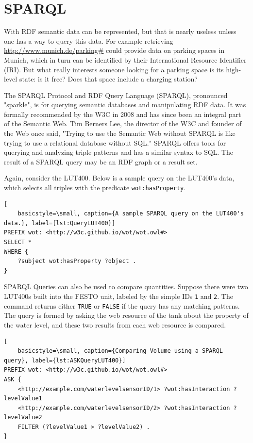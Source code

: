 \cite{Beckett.23.01.2018}

\section{SPARQL}
With RDF semantic data can be represented, but that is nearly useless unless one has a way to query this data.  For example retrieving \url{http://www.munich.de/parking#} could provide data on parking spaces in Munich, which in turn can be identified by their International Resource Identifier (IRI). \cite{Cyganiak.2014} But what really interests someone looking for a parking space is its high-level state: is it free? Does that space include a charging station?


The SPARQL  Protocol and RDF Query Language (SPARQL), pronounced "sparkle", is for querying semantic databases and manipulating RDF data. It was formally recommended by the W3C in 2008  \cite{Herman.2008} and has since been an integral part of the Semantic Web. Tim Berners Lee, the director of the W3C and founder of the Web once said, "Trying to use the Semantic Web without SPARQL is like trying to use a relational database without SQL." \cite{Herman.2008} SPARQL offers tools for querying and analyzing triple patterns and has a similar syntax to SQL. The result of a SPARQL query may be an RDF graph or a result set.

Again, consider the LUT400. Below is a sample query on the LUT400's data, which selects all triples with the predicate \texttt{wot:hasProperty}.

\begin{lstlisting}[
    basicstyle=\small, caption={A sample SPARQL query on the LUT400's data.}, label={lst:QueryLUT400}]
PREFIX wot: <http://w3c.github.io/wot/wot.owl#>
SELECT *
WHERE {
    ?subject wot:hasProperty ?object .
}
\end{lstlisting}

SPARQL Queries can also be used to compare quantities. Suppose there were two LUT400s built into the FESTO unit, labeled by the simple IDs \texttt{1} and \texttt{2}. The  command returns either \texttt{TRUE} or \texttt{FALSE} if the query has any matching patterns. The query is formed by asking the web resource of the tank about the property of the water level, and these two results from each web resource is compared.

\begin{lstlisting}[
    basicstyle=\small, caption={Comparing Volume using a SPARQL query}, label={lst:ASKQueryLUT400}]
PREFIX wot: <http://w3c.github.io/wot/wot.owl#>
ASK { 
    <http://example.com/waterlevelsensorID/1> ?wot:hasInteraction ?levelValue1
    <http://example.com/waterlevelsensorID/2> ?wot:hasInteraction ?levelValue2
    FILTER (?levelValue1 > ?levelValue2) .
}

\end{lstlisting}


\cite{.02Oct17}



